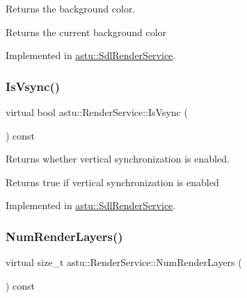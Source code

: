 Returns the background color.

\begin{DoxyReturn}{Returns}
the current background color 
\end{DoxyReturn}


Implemented in \hyperlink{classastu_1_1SdlRenderService_ae6e14e9be46ab88a1e04fa6ac7c5aa2c}{astu\+::\+Sdl\+Render\+Service}.

\mbox{\label{classastu_1_1RenderService_a63ee728bf462dcd71821b2104a1d631a}} 
\subsubsection{\texorpdfstring{Is\+Vsync()}{IsVsync()}}
{\footnotesize\ttfamily virtual bool astu\+::\+Render\+Service\+::\+Is\+Vsync (\begin{DoxyParamCaption}{ }\end{DoxyParamCaption}) const\hspace{0.3cm}{\ttfamily [pure virtual]}}

Returns whether vertical synchronization is enabled.

\begin{DoxyReturn}{Returns}
{\ttfamily true} if vertical synchronization is enabled 
\end{DoxyReturn}


Implemented in \hyperlink{classastu_1_1SdlRenderService_a3bcc49339bca8cd388c16caefb18cadf}{astu\+::\+Sdl\+Render\+Service}.

\mbox{\label{classastu_1_1RenderService_a2347b2ac2b5f57b79bad63de9b8e6841}} 
\subsubsection{\texorpdfstring{Num\+Render\+Layers()}{NumRenderLayers()}}
{\footnotesize\ttfamily virtual size\+\_\+t astu\+::\+Render\+Service\+::\+Num\+Render\+Layers (\begin{DoxyParamCaption}{ }\end{DoxyParamCaption}) const\hspace{0.3cm}{\ttfamily [pure virtual]}}

